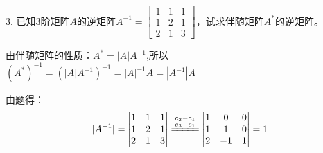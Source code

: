 \documentclass{article}
\begin{document}
3. 已知3阶矩阵$A$的逆矩阵$
A^{-1}=
\begin{bmatrix}
  1 & 1 & 1 \\
  1 & 2 & 1 \\
  2 & 1 & 3
\end{bmatrix}
$，试求伴随矩阵$A^{*}$的逆矩阵。

\begin{jie}
由伴随矩阵的性质：$A^{*}=|A|A^{-1}$,所以$(A^*)^{-1}=(|A|A^{-1})^{-1}=|A|^{-1}A=|A^{-1}|A$

由题得：
\begin{equation*}|A^{-1}|=
  \begin{vmatrix}
  1 & 1 & 1 \\
  1 & 2 & 1 \\
  2 & 1 & 3
  \end{vmatrix}\xlongequal{\substack{c_{2}-c_{1}\\c_{3}-c_{1}}}
  \begin{vmatrix}
  1 & 0 & 0 \\
  1 & 1 & 0 \\
  2 & -1 & 1
  \end{vmatrix}=1
\end{equation*}


\end{jie}
\end{document}
